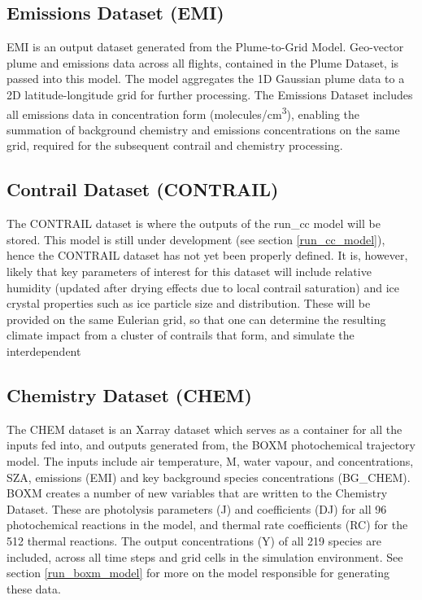 \subsection{Emissions Dataset (EMI)}
EMI is an output dataset generated from the Plume-to-Grid Model. Geo-vector plume and emissions data across all flights, contained in the Plume Dataset, is passed into this model. The model aggregates the 1D Gaussian plume data to a 2D latitude-longitude grid for further processing. The Emissions Dataset includes all emissions data in concentration form (molecules/cm\textsuperscript{3}), enabling the summation of background chemistry and emissions concentrations on the same grid, required for the subsequent contrail and chemistry processing.

\subsection{Contrail Dataset (CONTRAIL)}
The CONTRAIL dataset is where the outputs of the run\_cc model will be stored. This model is still under development (see section \ref{run_cc_model}), hence the CONTRAIL dataset has not yet been properly defined. It is, however, likely that key parameters of interest for this dataset will include relative humidity (updated after drying effects due to local contrail saturation) and ice crystal properties such as ice particle size and distribution. These will be provided on the same Eulerian grid, so that one can determine the resulting climate impact from a cluster of contrails that form, and simulate the interdependent

\subsection{Chemistry Dataset (CHEM)}
The CHEM dataset is an Xarray dataset which serves as a container for all the inputs fed into, and outputs generated from, the BOXM photochemical trajectory model. The inputs include air temperature, M, water vapour,  and  concentrations, SZA, emissions (EMI) and key background species concentrations (BG\_CHEM). BOXM creates a number of new variables that are written to the Chemistry Dataset. These are photolysis parameters (J) and coefficients (DJ) for all 96 photochemical reactions in the model, and thermal rate coefficients (RC) for the 512 thermal reactions. The output concentrations (Y) of all 219 species are included, across all time steps and grid cells in the simulation environment. See section \ref{run_boxm_model} for more on the model responsible for generating these data.



